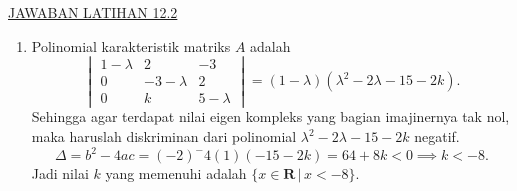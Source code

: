 \documentclass[a4paper]{article}
\theoremstyle{definisi}
\numberwithin{equation}{section}
\newcommand{\R}{\mathbf{R}}
\begin{document}
  \newpage
  \underline{JAWABAN LATIHAN 12.2}
  \begin{enumerate}
    \item Polinomial karakteristik matriks $A$ adalah 
    \begin{equation*}
      \begin{vmatrix}
        1-\lambda & 2 & -3\\
        0 & -3-\lambda & 2\\
        0 & k & 5-\lambda
      \end{vmatrix} = (1-\lambda)(\lambda^2-2\lambda-15-2k). 
    \end{equation*}
    Sehingga agar terdapat nilai eigen kompleks yang bagian imajinernya tak nol, maka haruslah diskriminan dari polinomial $\lambda^2-2\lambda-15-2k$ negatif. 
    \[\Delta = b^2-4ac = (-2)^-4(1)(-15-2k)=64+8k < 0 \implies k < -8.\]
    Jadi nilai $k$ yang memenuhi adalah $\{x\in\R\,|\,x<-8\}$.


\end{enumerate}
\end{document}
